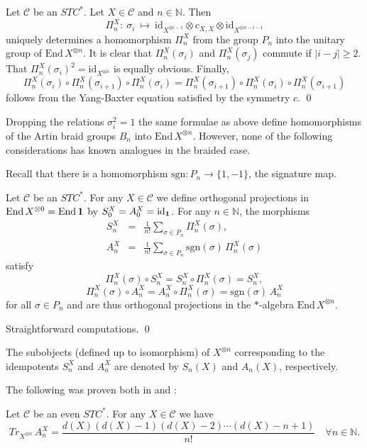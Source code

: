 \documentclass[12pt]{article}
\theoremstyle{definition}
\theoremstyle{definition}
\theoremstyle{remark}
\def\2#1{{\mathcal #1}}
\def\7#1{{\mathbb #1}}
\def\1#1{{\bf #1}}
\newcommand{\End}{\mathrm{End}}
\newcommand{\mcirc}{\circ}
\newcommand{\rarr}{\rightarrow}
\def\id{\mathrm{id}}
\begin{document}
\blemma Let $\2C$ be an $STC^*$. Let $X\in\2C$ and $n\in\7N$. Then 
\[ \Pi^X_n: \ \sigma_i \ \mapsto \ \id_{X^{\otimes i-1}}\otimes c_{X,X}\otimes\id_{X^{\otimes
  n-i-1}} \] 
uniquely determines a homomorphism $\Pi^X_n$ from the group $P_n$ into the unitary group of
$\End\,X^{\otimes n}$. 
\elemma
\prf It is clear that $\Pi^X_n(\sigma_i)$ and $\Pi^X_n(\sigma_j)$ commute if $|i-j|\ge 2$. 
That $\Pi^X_n(\sigma_i)^2=\id_{X^{\otimes n}}$ is equally obvious. Finally, 
\[ \Pi^X_n(\sigma_i)\mcirc \Pi^X_n(\sigma_{i+ 1})\mcirc \Pi^X_n(\sigma_i)=
  \Pi^X_n(\sigma_{i+ 1})\mcirc \Pi^X_n(\sigma_i)\mcirc \Pi^X_n(\sigma_{i+ 1})  \]
follows from the Yang-Baxter equation satisfied by the symmetry $c$.
\qed

\brem 
Dropping the relations $\sigma_i^2=1$ the same formulae as above define homomorphisms of the Artin
braid groups $B_n$ into $\End\,X^{\otimes n}$. However, none of the following considerations has
known analogues in the braided case. 
\erem

Recall that there is a homomorphism $\mathrm{sgn}: P_n\rarr\{1,-1\}$, the signature map.

\blemma \label{l-proj} 
Let $\2C$ be an $STC^*$. For any $X\in\2C$ we define orthogonal projections in 
$\End\,X^{\otimes 0}=\End\,\11$ by $S_0^X=A_0^X=\id_\11$. For any $n\in\7N$, the morphisms 
\begin{eqnarray*} 
S_n^X &=& \frac{1}{n!} \sum_{\sigma\in P_n} \Pi_n^X(\sigma), \\
A_n^X &=& \frac{1}{n!} \sum_{\sigma\in P_n} \mathrm{sgn}(\sigma) \,\Pi_n^X(\sigma)
\end{eqnarray*}
satisfy 
\[ \Pi_n^X(\sigma) \mcirc  S_n^X = S_n^X\mcirc  \Pi_n^X(\sigma) = S_n^X, \]
\[ \Pi_n^X(\sigma) \mcirc  A_n^X = A_n^X\mcirc  \Pi_n^X(\sigma) =  \mathrm{sgn}(\sigma)\,A_n^X \]
for all $\sigma\in P_n$ and are thus orthogonal projections in the $*$-algebra $\End\,X^{\otimes n}$. 
\elemma

\prf Straightforward computations. \qed

\bdefin 
The subobjects (defined up to isomorphism) of $X^{\otimes n}$ corresponding to the idempotents
$S_n^X$ and $A_n^X$ are denoted by $S_n(X)$ and $A_n(X)$, respectively.
\edefin

The following was proven both in \cite{DR} and \cite{del}:

\bprop \label{p-trace-an} 
Let $\2C$ be an even $STC^*$. For any $X\in\2C$ we have
\begin{equation} \label{e-traxn}
Tr_{X^{\otimes n}}\,A_n^X = \frac{d(X)(d(X)-1)(d(X)-2)\cdots (d(X)-n+1)}{n!} \quad \forall n\in\7N.
\end{equation}
\eprop
\end{document}
